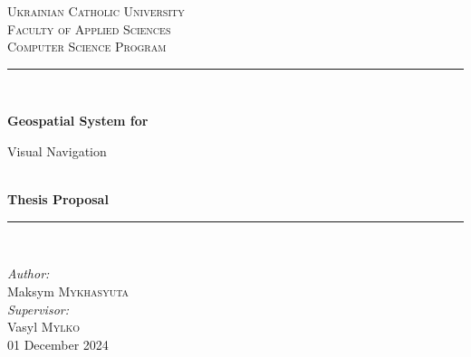 \documentclass[12pt]{article}
\begin{document}
\begin{titlepage}

\newcommand{\HRule}{\rule{\linewidth}{0.5mm}} %

\center %
 

\textsc{\LARGE Ukrainian Catholic University}\\[1cm] %
\textsc{\Large  Faculty of Applied Sciences}\\[0.5cm] %
\textsc{\large Computer Science Program}\\[0.5cm] %

\vspace*{1cm}

\HRule \\[0.4cm]
{ \huge \bfseries Geospatial System for 

Visual Navigation}\\[10pt]
{\Large \bfseries Thesis Proposal}\\[0.4cm] %
\HRule \\[1cm]
 
\vspace*{1cm}

\Large \emph{Author:}\\
Maksym \textsc{Mykhasyuta}\\ %
\Large \emph{Supervisor:}\\
Vasyl \textsc{Mylko}\\ %


\vspace*{1cm}
{\large 01 December 2024}\\[2cm] %


\end{titlepage}
\end{document}
